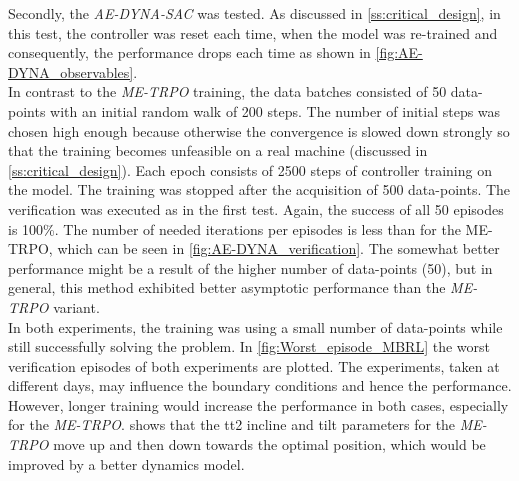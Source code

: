 \documentclass[
reprint,
amsmath,amssymb,amsfonts,clevref,
aps,
prstab,
]{revtex4-2}
\begin{document}
	Secondly, the \emph{AE-DYNA-SAC} was tested. As discussed in \cref{ss:critical_design}, in this test, the controller was reset each time, when the model was re-trained and consequently, the performance drops each time as shown in \cref{fig:AE-DYNA_observables}.\\
	In contrast to the \emph{ME-TRPO} training, the data batches consisted of 50 data-points with an initial random walk of 200 steps. The number of initial steps was chosen high enough because otherwise the convergence is slowed down strongly so that the training becomes unfeasible on a real machine (discussed in \cref{ss:critical_design}). Each epoch consists of 2500 steps of controller training on the model. The training was stopped after the acquisition of 500 data-points. The verification was executed as in the first test. Again, the success of all 50 episodes is 100\%. The number of needed iterations per episodes is less than for the ME-TRPO, which can be seen in \cref{fig:AE-DYNA_verification}. The somewhat better performance might be a result of the higher number of data-points (50), but in general, this method exhibited better asymptotic performance than the \emph{ME-TRPO} variant.\\
	In both experiments, the training was using a small number of data-points while still successfully solving the problem. In \cref{fig:Worst_episode_MBRL} the worst verification episodes of both experiments are plotted. The experiments, taken at different days, may influence the boundary conditions and hence the performance. However, longer training would increase the performance in both cases, especially for the \emph{ME-TRPO}.  shows that the tt2 incline and tilt parameters for the \emph{ME-TRPO} move up and then down towards the optimal position, which would be improved by a better dynamics model.
\end{document}
